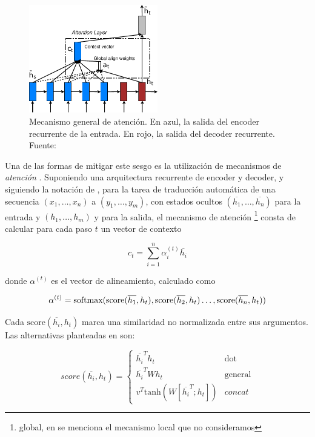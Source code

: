 \begin{figure}[t]
    \centering
    \includegraphics[width=0.5\textwidth]{img/02/attention_model.pdf}
    \caption{Mecanismo general de atención. En azul, la salida del encoder recurrente de la entrada. En rojo, la salida del decoder recurrente. Fuente: \citet{luong2015effective}}
    \label{fig:attention_mechanism}
\end{figure}


Una de las formas de mitigar este sesgo es la utilización de mecanismos de \emph{atención} \cite{bahdanau2014neural}. Suponiendo una arquitectura recurrente de encoder y decoder, y siguiendo la notación de \citet{luong2015effective}, para la tarea de traducción automática de una secuencia $(x_1, \ldots , x_n)$ a $(y_1, \ldots , y_m)$, con estados ocultos $(\overline{h_1}, \ldots , \overline{h_n})$ para la entrada y $(h_1, \ldots , h_m)$ y para la salida, el mecanismo de atención \footnote{global, en \citet{luong2015effective} se menciona el mecanismo local que no consideramos} consta de calcular para cada paso $t$ un vector de contexto

\begin{equation*}
    c_t = \sum_{i=1}^n \alpha_i^{(t)} \overline{h_i}
\end{equation*}

donde $\alpha^{(t)}$ es el vector de alineamiento, calculado como

\newcommand{\score}[0]{\text{score}}

\begin{equation*}
    \alpha^{(t)} = \softmax(\score(\overline{h_1}, h_t), \score(\overline{h_2}, h_t) \ldots , \score(\overline{h_n}, h_t))
\end{equation*}

Cada $\score(\overline{h_i}, h_t)$ marca una similaridad no normalizada entre sus argumentos. Las alternativas planteadas en \citet{luong2015effective} son:

\begin{equation}
    score(\overline{h_i}, h_t) =  \begin{cases}
        \overline{h_i}^T h_t   & \text{dot} \\
        \overline{h_i}^T W h_t & \text{general} \\
        v^T\text{tanh}(W [\overline{h_i}^T; h_t]) & concat
     \end{cases}
\end{equation}

